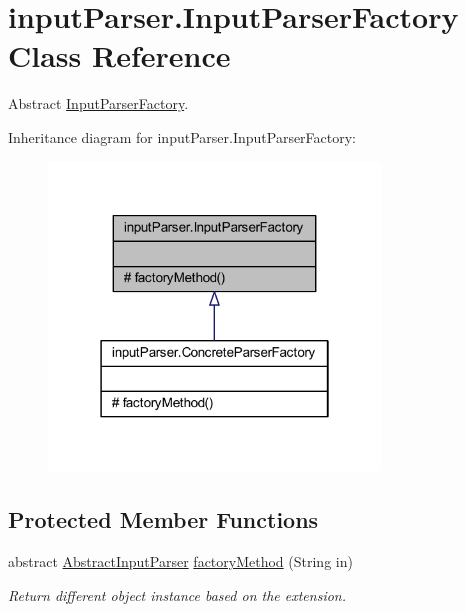 \hypertarget{classinput_parser_1_1_input_parser_factory}{\section{input\-Parser.\-Input\-Parser\-Factory Class Reference}
\label{classinput_parser_1_1_input_parser_factory}
}


Abstract \hyperlink{classinput_parser_1_1_input_parser_factory}{Input\-Parser\-Factory}.  




Inheritance diagram for input\-Parser.\-Input\-Parser\-Factory\-:
\nopagebreak
\begin{figure}[H]
\begin{center}
\leavevmode
\includegraphics[width=250pt]{classinput_parser_1_1_input_parser_factory__inherit__graph}
\end{center}
\end{figure}
\subsection*{Protected Member Functions}
\begin{DoxyCompactItemize}
\item 
abstract \hyperlink{classinput_parser_1_1_abstract_input_parser}{Abstract\-Input\-Parser} \hyperlink{classinput_parser_1_1_input_parser_factory_a48971c2679b589f34a7051e795d48c49}{factory\-Method} (String in)
\begin{DoxyCompactList}\small\item\em Return different object instance based on the extension. \end{DoxyCompactList}\end{DoxyCompactItemize}


